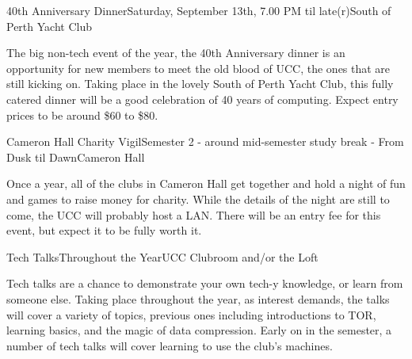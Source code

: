 \begin{event}{40th Anniversary Dinner}{Saturday, September 13th, 7.00 PM til late(r)}{South of Perth Yacht Club}

The big non-tech event of the year, the 40th Anniversary dinner is an opportunity for new members to meet the old blood of UCC, the ones that are still kicking on. Taking place in the lovely South of Perth Yacht Club, this fully catered dinner will be a good celebration of 40 years of computing. Expect entry prices to be around \$60 to \$80.

\end{event}

\pagebreak

\begin{event}{Cameron Hall Charity Vigil}{Semester 2 - around mid-semester study break - From Dusk til Dawn}{Cameron Hall}

Once a year, all of the clubs in Cameron Hall get together and hold a night of fun and games to raise money for charity. While the details of the night are still to come, the UCC will probably host a LAN. There will be an entry fee for this event, but expect it to be fully worth it.

\end{event}


\begin{event}{Tech Talks}{Throughout the Year}{UCC Clubroom and/or the Loft}

Tech talks are a chance to demonstrate your own tech-y knowledge, or learn from someone else. Taking place throughout the year, as interest demands, the talks will cover a variety of topics, previous ones including introductions to TOR, learning basics, and the magic of data compression. Early on in the semester, a number of tech talks will cover learning to use the club's machines.

\end{event}

\pagebreak


